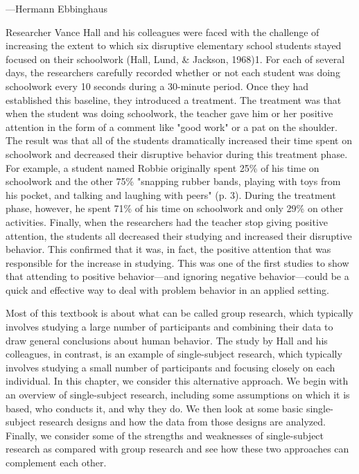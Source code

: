  {---Hermann Ebbinghaus}

Researcher Vance Hall and his colleagues were faced with the challenge of increasing the extent to which six disruptive elementary school students stayed focused on their schoolwork (Hall, Lund, \& Jackson, 1968)1. For each of several days, the researchers carefully recorded whether or not each student was doing schoolwork every 10 seconds during a 30-minute period. Once they had established this baseline, they introduced a treatment. The treatment was that when the student was doing schoolwork, the teacher gave him or her positive attention in the form of a comment like "good work" or a pat on the shoulder. The result was that all of the students dramatically increased their time spent on schoolwork and decreased their disruptive behavior during this treatment phase. For example, a student named Robbie originally spent 25\% of his time on schoolwork and the other 75\% "snapping rubber bands, playing with toys from his pocket, and talking and laughing with peers" (p. 3). During the treatment phase, however, he spent 71\% of his time on schoolwork and only 29\% on other activities. Finally, when the researchers had the teacher stop giving positive attention, the students all decreased their studying and increased their disruptive behavior. This confirmed that it was, in fact, the positive attention that was responsible for the increase in studying. This was one of the first studies to show that attending to positive behavior---and ignoring negative behavior---could be a quick and effective way to deal with problem behavior in an applied setting.

Most of this textbook is about what can be called group research, which typically involves studying a large number of participants and combining their data to draw general conclusions about human behavior. The study by Hall and his colleagues, in contrast, is an example of single-subject research, which typically involves studying a small number of participants and focusing closely on each individual. In this chapter, we consider this alternative approach. We begin with an overview of single-subject research, including some assumptions on which it is based, who conducts it, and why they do. We then look at some basic single-subject research designs and how the data from those designs are analyzed. Finally, we consider some of the strengths and weaknesses of single-subject research as compared with group research and see how these two approaches can complement each other.

